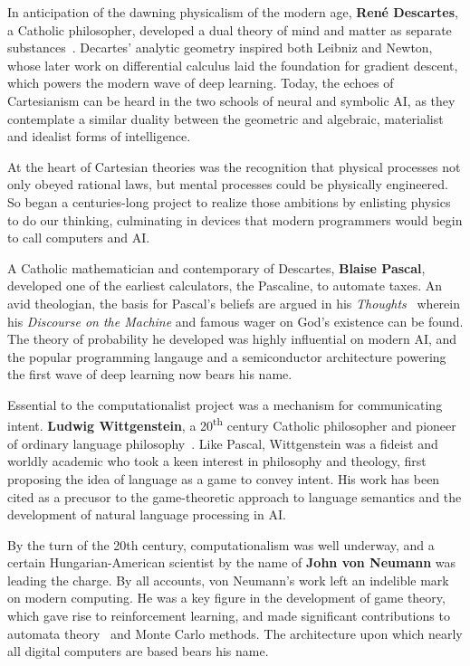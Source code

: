 \documentclass[sigplan,nonacm]{acmart}\settopmatter{printfolios=false,printccs=false,printacmref=false}
\begin{document}
In anticipation of the dawning physicalism of the modern age, \textbf{Ren\'e Descartes}, a Catholic philosopher, developed a dual theory of mind and matter as separate substances~\cite{descartes1641meditationes}. Decartes' analytic geometry inspired both Leibniz and Newton, whose later work on differential calculus laid the foundation for gradient descent, which powers the modern wave of deep learning. Today, the echoes of Cartesianism can be heard in the two schools of neural and symbolic AI, as they contemplate a similar duality between the geometric and algebraic, materialist and idealist forms of intelligence.

At the heart of Cartesian theories was the recognition that physical processes not only obeyed rational laws, but mental processes could be physically engineered. So began a centuries-long project to realize those ambitions by enlisting physics to do our thinking, culminating in devices that modern programmers would begin to call computers and AI.

A Catholic mathematician and contemporary of Descartes, \textbf{Blaise Pascal}, developed one of the earliest calculators, the Pascaline, to automate taxes. An avid theologian, the basis for Pascal's beliefs are argued in his \textit{Thoughts}~\cite{pascal1670pensees} wherein his \textit{Discourse on the Machine} and famous wager on God's existence can be found. The theory of probability he developed was highly influential on modern AI, and the popular programming langauge and a semiconductor architecture powering the first wave of deep learning now bears his name.

Essential to the computationalist project was a mechanism for communicating intent. \textbf{Ludwig Wittgenstein}, a 20\textsuperscript{th} century Catholic philosopher and pioneer of ordinary language philosophy~\cite{wittgenstein1929some}. Like Pascal, Wittgenstein was a fideist and worldly academic who took a keen interest in philosophy and theology, first proposing the idea of language as a game to convey intent. His work has been cited as a precusor to the game-theoretic approach to language semantics and the development of natural language processing in AI.

By the turn of the 20th century, computationalism was well underway, and a certain Hungarian-American scientist by the name of \textbf{John von Neumann} was leading the charge. By all accounts, von Neumann's work left an indelible mark on modern computing. He was a key figure in the development of game theory, which gave rise to reinforcement learning, and made significant contributions to automata theory~\cite{von2017general} and Monte Carlo methods. The architecture upon which nearly all digital computers are based bears his name.
\end{document}
